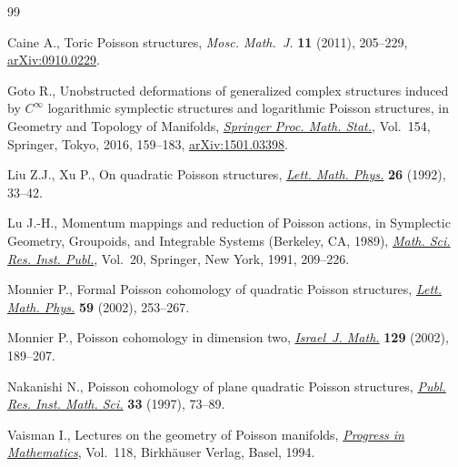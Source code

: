 \begin{thebibliography}{99}
\footnotesize\itemsep=0pt

Caine A., Toric {P}oisson structures, \textit{Mosc. Math.~J.} \textbf{11}
 (2011), 205--229, \href{http://arxiv.org/abs/0910.0229}{arXiv:0910.0229}.

Goto R., Unobstructed deformations of generalized complex structures induced by
 {$C^\infty$} logarithmic symplectic structures and logarithmic {P}oisson
 structures, in Geometry and Topology of Manifolds, \href{https://doi.org/10.1007/978-4-431-56021-0_9}{\textit{Springer Proc.
 Math. Stat.}}, Vol.~154, Springer, Tokyo, 2016, 159--183, \href{http://arxiv.org/abs/1501.03398}{arXiv:1501.03398}.

Liu Z.J., Xu P., On quadratic {P}oisson structures, \href{https://doi.org/10.1007/BF00420516}{\textit{Lett. Math. Phys.}}
 \textbf{26} (1992), 33--42.

Lu J.-H., Momentum mappings and reduction of {P}oisson actions, in Symplectic
 Geometry, Groupoids, and Integrable Systems ({B}erkeley, {CA}, 1989),
 \href{https://doi.org/10.1007/978-1-4613-9719-9_15}{\textit{Math. Sci. Res. Inst. Publ.}}, Vol.~20, Springer, New York, 1991,
 209--226.

Monnier P., Formal {P}oisson cohomology of quadratic {P}oisson structures,
 \href{https://doi.org/10.1023/A:1015513632414}{\textit{Lett. Math. Phys.}} \textbf{59} (2002), 253--267.

Monnier P., Poisson cohomology in dimension two, \href{https://doi.org/10.1007/BF02773163}{\textit{Israel~J. Math.}}
 \textbf{129} (2002), 189--207.

Nakanishi N., Poisson cohomology of plane quadratic {P}oisson structures,
 \href{https://doi.org/10.2977/prims/1195145534}{\textit{Publ. Res. Inst. Math. Sci.}} \textbf{33} (1997), 73--89.

Vaisman I., Lectures on the geometry of {P}oisson manifolds, \href{https://doi.org/10.1007/978-3-0348-8495-2}{\textit{Progress
 in Mathematics}}, Vol.~118, Birkh\"auser Verlag, Basel, 1994.

\end{thebibliography}
